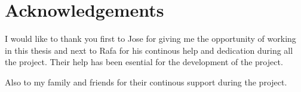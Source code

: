 \section*{Acknowledgements}
I would like to thank you first to Jose for giving me the opportunity of working in this thesis
and next to Rafa for his continous help and dedication during all the project. Their help has
been esential for the development of the project.

Also to my family and friends for their continous support during the project.




